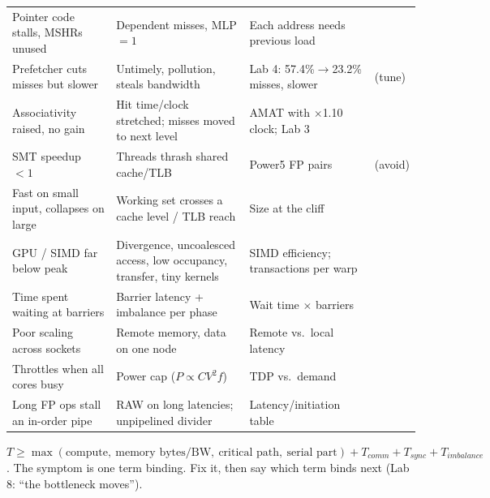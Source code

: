 \begin{longtable}{L{3.4cm}L{5.3cm}L{3.5cm}L{3.5cm}}
Pointer code stalls, MSHRs unused & Dependent misses, MLP $=1$ & Each address needs previous load &    \\
Prefetcher cuts misses but slower & Untimely, pollution, steals bandwidth & Lab 4: 57.4\%$\rightarrow$23.2\% misses, slower &  (tune)  \\
Associativity raised, no gain & Hit time/clock stretched; misses moved to next level & AMAT with $\times$1.10 clock; Lab 3 &    \\
SMT speedup $<1$ & Threads thrash shared cache/TLB & Power5 FP pairs &  (avoid)   \\
Fast on small input, collapses on large & Working set crosses a cache level / TLB reach & Size at the cliff &    \\
GPU / SIMD far below peak & Divergence, uncoalesced access, low occupancy, transfer, tiny kernels & SIMD efficiency; transactions per warp &      \\
Time spent waiting at barriers & Barrier latency + imbalance per phase & Wait time $\times$ barriers &   \\
Poor scaling across sockets & Remote memory, data on one node & Remote vs.\ local latency &   \\
Throttles when all cores busy & Power cap ($P\propto CV^2f$) & TDP vs.\ demand &    \\
Long FP ops stall an in-order pipe & RAW on long latencies; unpipelined divider & Latency/initiation table &    \\
\bottomrule
\end{longtable}
\normalsize
\begin{key}
$T \ge \max(\text{compute},\ \text{memory bytes}/\text{BW},\ \text{critical path},\ \text{serial part}) + T_{comm}+T_{sync}+T_{imbalance}$. The symptom is one term binding. Fix it, then say which term binds next (Lab 8: ``the bottleneck moves'').
\end{key}
